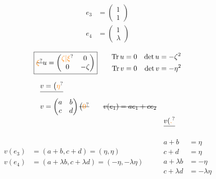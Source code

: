 
\[
\begin{aligned}e_3&=\begin{pmatrix}1\\1\end{pmatrix}\\e_4&=\begin{pmatrix}1\\\lambda\end{pmatrix}\end{aligned}
\]

\[
\boxed{\deleted{\unsure{\xi}}u=\begin{pmatrix}\unsure{\zeta|\xi}&0\\0&-\zeta\end{pmatrix}}
\qquad\begin{aligned}\operatorname{Tr}u&=0&\det u&=-\zeta^2\\\operatorname{Tr}v&=0&\det v&=-\eta^2\end{aligned}
\]

\[
\begin{aligned}
&\deleted{v=\bigl(\unsure{\eta}}\\
&v=\begin{pmatrix}a&b\\c&d\end{pmatrix}\deleted{\bigl(\unsure{0}}\qquad\deleted{v(e_1)=ae_1+ce_2}\\[-2pt]
&&\deleted{v(\unsure{.}}
\end{aligned}
\]

\[
\begin{aligned}
v(e_3)&=(a+b,c+d)=(\eta,\eta)\\
v(e_4)&=(a+\lambda b,c+\lambda d)=(-\eta,-\lambda\eta)
\end{aligned}
\qquad
\begin{aligned}a+b&=\eta\\c+d&=\eta\\a+\lambda b&=-\eta\\c+\lambda d&=-\lambda\eta\end{aligned}
\]

